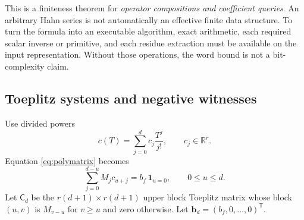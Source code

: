 \documentclass[11pt,a4paper]{article}
\numberwithin{equation}{section}
\theoremstyle{definition}
\theoremstyle{remark}\newtheorem{remark}[theorem]{Remark}
\newcommand{\R}{\mathbb R}\newcommand{\C}{\mathbb C}
\begin{document}
This is a finiteness theorem for \emph{operator compositions and coefficient queries}. An arbitrary Hahn series is not automatically an effective finite data structure. To turn the formula into an executable algorithm, exact arithmetic, each required scalar inverse or primitive, and each residue extraction must be available on the input representation. Without those operations, the word bound is not a bit-complexity claim.

\subsection{Toeplitz systems and negative witnesses}
Use divided powers
\[
 c(T)=\sum_{j=0}^d c_j\frac{T^j}{j!},\qquad c_j\in\R^r.
\]
Equation \eqref{eq:polymatrix} becomes
\begin{equation}
 \sum_{j=0}^{d-u}M_jc_{u+j}=b_f\,\mathbf1_{u=0},
 \qquad 0\le u\le d.
 \label{eq:toeplitzeq}
\end{equation}
Let $\mathsf C_d$ be the $r(d+1)\times r(d+1)$ upper block Toeplitz matrix whose block $(u,v)$ is $M_{v-u}$ for $v\ge u$ and zero otherwise. Let $\mathbf b_d=(b_f,0,\ldots,0)^{\mathsf T}$.
\end{document}
